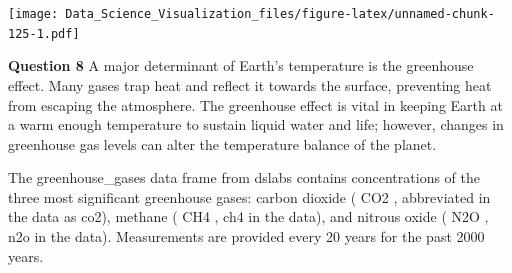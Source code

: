 \documentclass[
]{article}
\newenvironment{Shaded}{\begin{snugshade}}{\end{snugshade}}
\newcommand{\DataTypeTok}[1]{\textcolor[rgb]{0.13,0.29,0.53}{#1}}
\newcommand{\DecValTok}[1]{\textcolor[rgb]{0.00,0.00,0.81}{#1}}
\newcommand{\FloatTok}[1]{\textcolor[rgb]{0.00,0.00,0.81}{#1}}
\newcommand{\KeywordTok}[1]{\textcolor[rgb]{0.13,0.29,0.53}{\textbf{#1}}}
\newcommand{\NormalTok}[1]{#1}
\newcommand{\OperatorTok}[1]{\textcolor[rgb]{0.81,0.36,0.00}{\textbf{#1}}}
\newcommand{\StringTok}[1]{\textcolor[rgb]{0.31,0.60,0.02}{#1}}
\begin{document}
\begin{Shaded}
\end{Shaded}

\texttt{[image: Data\_Science\_Visualization\_files/figure-latex/unnamed-chunk-125-1.pdf]}

\textbf{Question 8} A major determinant of Earth's temperature is the
greenhouse effect. Many gases trap heat and reflect it towards the
surface, preventing heat from escaping the atmosphere. The greenhouse
effect is vital in keeping Earth at a warm enough temperature to sustain
liquid water and life; however, changes in greenhouse gas levels can
alter the temperature balance of the planet.

The greenhouse\_gases data frame from dslabs contains concentrations of
the three most significant greenhouse gases: carbon dioxide ( CO2 ,
abbreviated in the data as co2), methane ( CH4 , ch4 in the data), and
nitrous oxide ( N2O , n2o in the data). Measurements are provided every
20 years for the past 2000 years.
\end{document}

